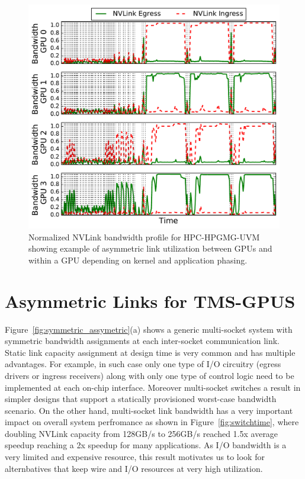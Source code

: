 \begin{figure}[t]
    \centering
    \includegraphics[width=1.0\columnwidth]{figures/bw_profile_HPGMG_UVM_base.pdf}
    \caption{Normalized NVLink bandwidth profile for HPC-HPGMG-UVM showing example of asymmetric 
    link utilization between GPUs and within a GPU depending on kernel and application phasing.}
    \label{fig:link-motivation}
\end{figure}

\section{Asymmetric Links for TMS-GPUS}
\label{interconnect}

Figure~\ref{fig:symmetric_assymetric}(a) shows a generic multi-socket system
with symmetric bandwidth assignments at each inter-socket communication link.
Static link capacity assignment at design time is very common and has multiple
advantages. For example, in such case only one type of I/O circuitry (egress
drivers or ingress receivers) along with only one type of control logic need to
be implemented at each on-chip interface. Moreover multi-socket switches a
result in simpler designs that support a statically provisioned worst-case
bandwidth scenario. On the other hand, multi-socket link bandwidth has a very
important impact on overall system perfromance as shown in
Figure~\ref{fig:switchtime}, where doubling NVLink capacity from 128GB/s to
256GB/s reached 1.5x average speedup reaching a 2x speedup for many
applications. As I/O bandwidth is a very limited and expensive resource, this
result motivates us to look for alternbatives that keep wire and I/O resources
at very high utilization. 

